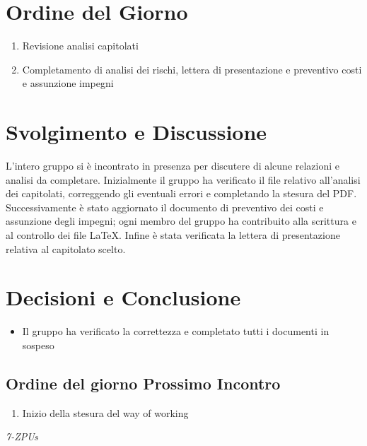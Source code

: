 \documentclass[a4paper,12pt]{article}
\begin{document}
\section{Ordine del Giorno}
\begin{enumerate}
    \item Revisione analisi capitolati
    \item Completamento di analisi dei rischi, lettera di presentazione e preventivo costi e assunzione impegni
\end{enumerate}
\vspace{0.5cm}
\section{Svolgimento e Discussione}
L'intero gruppo si è incontrato in presenza per discutere di alcune relazioni e analisi da completare.
Inizialmente il gruppo ha verificato il file relativo all'analisi dei capitolati, correggendo gli eventuali errori e completando la stesura del PDF.
Successivamente è stato aggiornato il documento di preventivo dei costi e assunzione degli impegni; ogni membro del gruppo ha contribuito alla scrittura e al controllo dei file LaTeX.
Infine è stata verificata la lettera di presentazione relativa al capitolato scelto.
\vspace{0.5cm}
\section{Decisioni e Conclusione}
\begin{itemize}
    \item Il gruppo ha verificato la correttezza e completato tutti i documenti in sospeso 
\end{itemize}

\subsection{Ordine del giorno Prossimo Incontro}
\begin{enumerate}
    \item Inizio della stesura del way of working
\end{enumerate}

\vfill
\begin{flushright}
    \textit{7-ZPUs}
\end{flushright}
\end{document}

